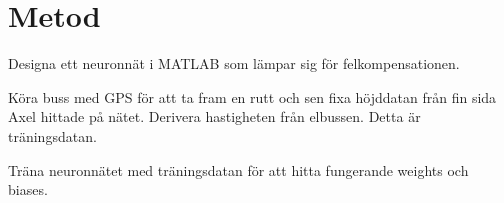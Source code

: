 \section{Metod}

Designa ett neuronnät i MATLAB som lämpar sig för felkompensationen.

Köra buss med GPS för att ta fram en rutt och sen fixa höjddatan från
fin sida Axel hittade på nätet.
Derivera hastigheten från elbussen.
Detta är träningsdatan.

Träna neuronnätet med träningsdatan för att hitta fungerande weights och biases.

